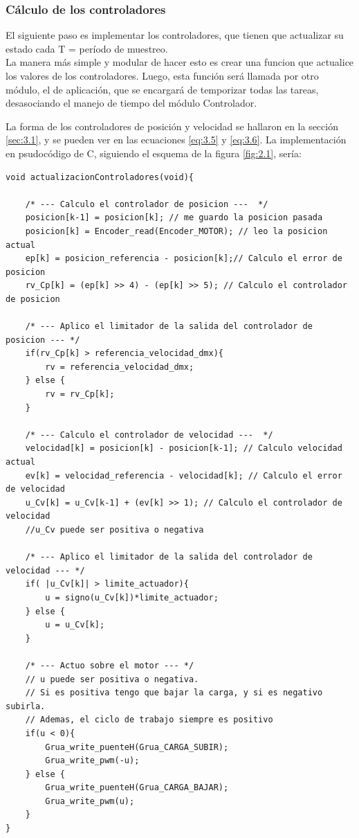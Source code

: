 \subsubsection{Cálculo de los controladores}
El siguiente paso es implementar los controladores, que tienen que actualizar su estado cada T = período de muestreo. \\
La manera más simple y modular de hacer esto es crear una funcion que actualice los valores de los controladores. Luego, esta función será llamada por otro módulo, el de aplicación, que se encargará de temporizar todas las tareas, desasociando el manejo de tiempo del módulo Controlador.

La forma de los controladores de posición y velocidad se hallaron en la sección \ref{sec:3.1}, y se pueden ver en las ecuaciones \ref{eq:3.5} y \ref{eq:3.6}. La implementación en psudocódigo de C, siguiendo el esquema de la figura \ref{fig:2.1}, sería:

\begin{lstlisting}[style=CStyle]
void actualizacionControladores(void){

	/* --- Calculo el controlador de posicion ---  */
	posicion[k-1] = posicion[k]; // me guardo la posicion pasada
	posicion[k] = Encoder_read(Encoder_MOTOR); // leo la posicion actual
	ep[k] = posicion_referencia - posicion[k];// Calculo el error de posicion
	rv_Cp[k] = (ep[k] >> 4) - (ep[k] >> 5); // Calculo el controlador de posicion
	
	/* --- Aplico el limitador de la salida del controlador de posicion --- */
	if(rv_Cp[k] > referencia_velocidad_dmx){
		rv = referencia_velocidad_dmx;
	} else {
		rv = rv_Cp[k];
	}
	
	/* --- Calculo el controlador de velocidad ---  */
	velocidad[k] = posicion[k] - posicion[k-1]; // Calculo velocidad actual
	ev[k] = velocidad_referencia - velocidad[k]; // Calculo el error de velocidad
	u_Cv[k] = u_Cv[k-1] + (ev[k] >> 1); // Calculo el controlador de velocidad
	//u_Cv puede ser positiva o negativa
	
	/* --- Aplico el limitador de la salida del controlador de velocidad --- */
	if( |u_Cv[k]| > limite_actuador){
		u = signo(u_Cv[k])*limite_actuador;
	} else {
		u = u_Cv[k];
	}
	
	/* --- Actuo sobre el motor --- */
	// u puede ser positiva o negativa. 
	// Si es positiva tengo que bajar la carga, y si es negativo subirla.
	// Ademas, el ciclo de trabajo siempre es positivo
	if(u < 0){
		Grua_write_puenteH(Grua_CARGA_SUBIR);
		Grua_write_pwm(-u);
	} else {
		Grua_write_puenteH(Grua_CARGA_BAJAR);
		Grua_write_pwm(u);
	}
}
\end{lstlisting}

